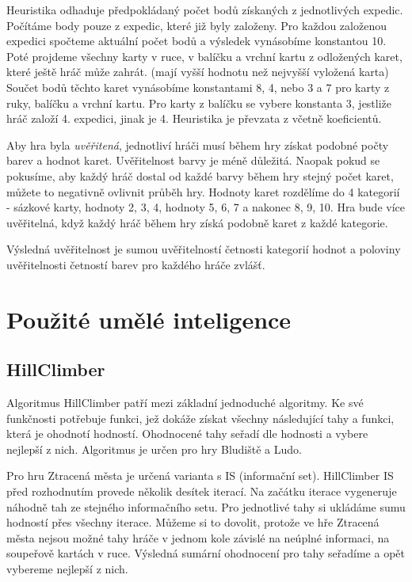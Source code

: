 Heuristika odhaduje předpokládaný počet bodů získaných z jednotlivých expedic. Počítáme body pouze z expedic, které již byly založeny. Pro každou založenou expedici spočteme aktuální počet bodů a výsledek vynásobíme konstantou 10. Poté projdeme všechny karty v ruce, v balíčku a vrchní kartu z odložených karet, které ještě hráč může zahrát. (mají vyšší hodnotu než nejvyšší vyložená karta) Součet bodů těchto karet vynásobíme konstantami 8, 4, nebo 3 a 7 pro karty z ruky, balíčku a vrchní kartu. Pro karty z balíčku se vybere konstanta 3, jestliže hráč založí 4. expedici, jinak je 4. Heuristika je převzata z \cite{ch5LT} včetně koeficientů.

Aby hra byla \emph{uvěřitená}, jednotliví hráči musí během hry získat podobné počty barev a hodnot karet. Uvěřitelnost barvy je méně důležitá. Naopak pokud se pokusíme, aby každý hráč dostal od každé barvy během hry stejný počet karet, můžete to negativně ovlivnit průběh hry. Hodnoty karet rozdělíme do 4 kategorií - sázkové karty, hodnoty 2, 3, 4, hodnoty 5, 6, 7 a nakonec 8, 9, 10. Hra bude více uvěřitelná, když každý hráč během hry získá podobně karet z každé kategorie.

Výsledná uvěřitelnost je sumou uvěřitelností četnosti kategorií hodnot a poloviny uvěřitelnosti četností barev pro každého hráče zvlášť.

\section{Použité umělé inteligence}

\subsection{HillClimber}

Algoritmus HillClimber patří mezi základní jednoduché algoritmy. Ke své funkčnosti potřebuje funkci, jež dokáže získat všechny následující tahy a funkci, která je ohodnotí hodností. Ohodnocené tahy seřadí dle hodnosti a vybere nejlepší z nich. Algoritmus je určen pro hry Bludiště a Ludo.

Pro hru Ztracená města je určená varianta s IS (informační set). HillClimber IS před rozhodnutím provede několik desítek iterací. Na začátku iterace vygeneruje náhodně tah ze stejného informačního setu. Pro jednotlivé tahy si ukládáme sumu hodností přes všechny iterace. Můžeme si to dovolit, protože ve hře Ztracená města nejsou možné tahy hráče v jednom kole závislé na neúplné informaci, na soupeřově kartách v ruce. Výsledná sumární ohodnocení pro tahy seřadíme a opět vybereme nejlepší z nich.

